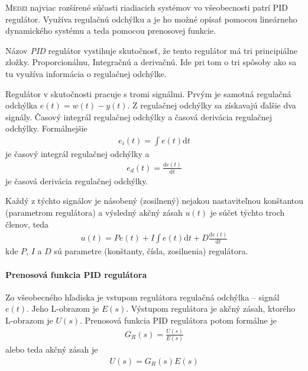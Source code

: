 \documentclass[a4paper, 10pt, ]{article}
\begin{document}
\normalsize
\normalfont












\noindent
\lettrine[lines=1, nindent=1pt, loversize=0.0]{M}{edzi} 
najviac rozšírené súčasti riadiacich systémov vo všeobecnosti patrí PID regulátor. Využíva regulačnú odchýlku a je ho možné opísať pomocou lineárneho dynamického systému a teda pomocou prenosovej funkcie.


Názov \emph{PID} regulátor vystihuje skutočnosť, že tento regulátor má tri principiálne zložky. Proporcionálnu, Integračnú a derivačnú. Ide pri tom o tri spôsoby ako sa tu využíva informácia o regulačnej odchýlke.

Regulátor v skutočnosti pracuje s tromi signálmi. Prvým je samotná regulačná odchýlka $e(t) = w(t) - y(t)$. Z regulačnej odchýlky sa získavajú ďalšie dva signály. Časový integrál regulačnej odchýlky a časová derivácia regulačnej odchýlky. Formálnejšie
\begin{align}
    e_i(t) = \int e(t) \text{d}t
\end{align}
je časový integrál regulačnej odchýlky a
\begin{align}
    e_d(t) = \frac{\text{d}e(t)}{\text{d}t}
\end{align}
je časová derivácia regulačnej odchýlky.

Každý z týchto signálov je násobený (zosilnený) nejakou nastaviteľnou konštantou (parametrom regulátora) a výsledný akčný zásah $u(t)$ je súčet týchto troch členov, teda
\begin{align}
    u(t) = P e(t) + I  \int e(t) \text{d}t + D  \frac{\text{d}e(t)}{\text{d}t}
\end{align}
kde $P$, $I$ a $D$ sú parametre (konštanty, čísla, zosilnenia) regulátora.





\paragraph{Prenosová funkcia PID regulátora}


Zo všeobecného hľadiska je vstupom regulátora regulačná odchýlka -- signál $e(t)$. Jeho L-obrazom je $E(s)$. Výstupom regulátora je akčný zásah, ktorého L-obrazom je $U(s)$. Prenosová funkcia PID regulátora potom formálne je
\begin{align}
    G_R(s) = \frac{U(s)}{E(s)}
\end{align}
alebo teda akčný zásah je
\begin{align}
    U(s) = G_R(s) E(s)
\end{align}
\end{document}
